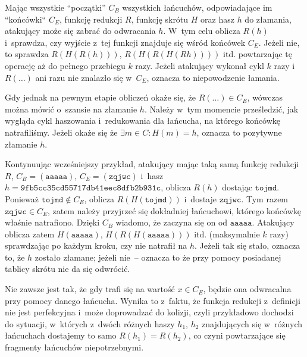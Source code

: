 Mając wszystkie ``początki'' $C_B$ wszystkich łańcuchów, odpowiadające im
``końcówki`` $C_E$, funkcję redukcji $R$, funkcję skrótu $H$ oraz hasz $h$ do
złamania, atakujący może się zabrać do odwracania $h$. W~tym celu oblicza
$R(h)$ i~sprawdza, czy wyjście z~tej funkcji znajduje się wśród końcówek $C_E$.
Jeżeli nie, to sprawdza $R(H(R(h)))$, $R(H(R(H(Rh))))$ itd. powtarzając tę
operację aż do pełnego przebiegu $k$ razy. Jeżeli atakujący wykonał cykl $k$
razy i~$R(\ldots)$ ani razu nie znalazło się w~$C_E$, oznacza to niepowodzenie
łamania.

Gdy jednak na pewnym etapie obliczeń okaże się, że $R(\ldots) \in C_E$, wówczas
można mówić o~szansie na złamanie $h$. Należy w~tym momencie prześledzić, jak
wygląda cykl haszowania i~redukowania dla łańcucha, na którego końcówkę
natrafiliśmy. Jeżeli okaże się że $\exists m \in C : H(m) = h$, oznacza to
pozytywne złamanie $h$.

Kontynuując wcześniejszy przykład, atakujący mając taką samą funkcję redukcji
$R$, $C_B = (\mathtt{aaaaa})$, $C_E = (\mathtt{zqjwc})$ i~hasz
$h=\mathtt{9fb5cc35cd55717db41eec8dfb2b931c}$, oblicza $R(h)$ dostając
$\mathtt{tojmd}$. Ponieważ $\mathtt{tojmd} \not\in C_E$, oblicza
$R(H(\mathtt{tojmd}))$ i~dostaje $\mathtt{zqjwc}$. Tym razem $\mathtt{zqjwc}
\in C_E$, zatem należy przyjrzeć się dokładniej łańcuchowi, którego końcówkę
właśnie natrafiono. Dzięki $C_B$ wiadomo, że zaczyna się on od
$\mathtt{aaaaa}$. Atakujący oblicza zatem $H(\mathtt{aaaaa})$,
$H(R(H(\mathtt{aaaaa})))$ itd. (maksymalnie $k$ razy) sprawdzając po każdym
kroku, czy nie natrafił na $h$. Jeżeli tak się stało, oznacza to, że $h$
zostało złamane; jeżeli nie~-- oznacza to że przy pomocy posiadanej tablicy
skrótu nie da się odwrócić.

Nie zawsze jest tak, że gdy trafi się na wartość $x \in C_E$, będzie ona
odwracalna przy pomocy danego łańcucha. Wynika to z~faktu, że funkcja redukcji
z~definicji nie jest perfekcyjna i~może doprowadzać do kolizji, czyli
przykładowo dochodzi do sytuacji, w~których z~dwóch różnych haszy $h_1$, $h_2$
znajdujących się w~różnych łańcuchach dostajemy to samo $R(h_1) = R(h_2)$, co
czyni powtarzające się fragmenty łańcuchów niepotrzebnymi.

